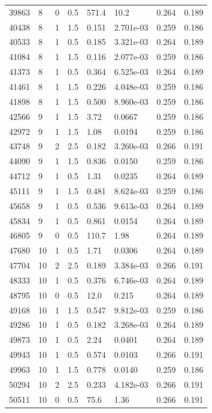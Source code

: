 \documentclass[preview]{standalone}
\begin{document}
{{{\begin{tabular}{L{1.2cm}C{1.2cm} C{0.3cm}C{0.5cm} C{1.4cm}C{1.4cm} C{1.4cm}C{1.4cm}}
  39863  &     8  & 0     & 0.5 &  571.4  & 10.2  & 0.264 &  0.189   \\ 
  40438  &     8  & 1     & 1.5 &  0.151  & 2.701e-03  & 0.259 &  0.186   \\ 
  40533  &     8  & 1     & 0.5 &  0.185  & 3.321e-03  & 0.264 &  0.189   \\ 
  41084  &     8  & 1     & 1.5 &  0.116  & 2.077e-03  & 0.259 &  0.186   \\ 
  41373  &     8  & 1     & 0.5 &  0.364  & 6.525e-03  & 0.264 &  0.189   \\ 
  41461  &     8  & 1     & 1.5 &  0.226  & 4.048e-03  & 0.259 &  0.186   \\ 
  41898  &     8  & 1     & 1.5 &  0.500  & 8.960e-03  & 0.259 &  0.186   \\ 
  42566  &     9  & 1     & 1.5 &  3.72  & 0.0667  & 0.259 &  0.186   \\ 
  42972  &     9  & 1     & 1.5 &  1.08  & 0.0194  & 0.259 &  0.186   \\ 
  43748  &     9  & 2     & 2.5 &  0.182  & 3.260e-03  & 0.266 &  0.191   \\ 
  44090  &     9  & 1     & 1.5 &  0.836  & 0.0150  & 0.259 &  0.186   \\ 
  44712  &     9  & 1     & 0.5 &  1.31  & 0.0235  & 0.264 &  0.189   \\ 
  45111  &     9  & 1     & 1.5 &  0.481  & 8.624e-03  & 0.259 &  0.186   \\ 
  45658  &     9  & 1     & 0.5 &  0.536  & 9.613e-03  & 0.264 &  0.189   \\ 
  45834  &     9  & 1     & 0.5 &  0.861  & 0.0154  & 0.264 &  0.189   \\ 
  46805  &     9  & 0     & 0.5 &  110.7  & 1.98  & 0.264 &  0.189   \\ 
  47680  &    10  & 1     & 0.5 &  1.71  & 0.0306  & 0.264 &  0.189   \\ 
  47704  &    10  & 2     & 2.5 &  0.189  & 3.384e-03  & 0.266 &  0.191   \\ 
  48333  &    10  & 1     & 0.5 &  0.376  & 6.746e-03  & 0.264 &  0.189   \\ 
  48795  &    10  & 0     & 0.5 &  12.0  & 0.215  & 0.264 &  0.189   \\ 
  49168  &    10  & 1     & 1.5 &  0.547  & 9.812e-03  & 0.259 &  0.186   \\ 
  49286  &    10  & 1     & 0.5 &  0.182  & 3.268e-03  & 0.264 &  0.189   \\ 
  49873  &    10  & 1     & 0.5 &  2.24  & 0.0401  & 0.264 &  0.189   \\ 
  49943  &    10  & 1     & 0.5 &  0.574  & 0.0103  & 0.266 &  0.191   \\ 
  49963  &    10  & 1     & 1.5 &  0.778  & 0.0140  & 0.259 &  0.186   \\ 
  50294  &    10  & 2     & 2.5 &  0.233  & 4.182e-03  & 0.266 &  0.191   \\ 
  50511  &    10  & 0     & 0.5 &  75.6  & 1.36  & 0.266 &  0.191   \\ 
\hline 
\end{tabular} 

}}}
\end{document}
